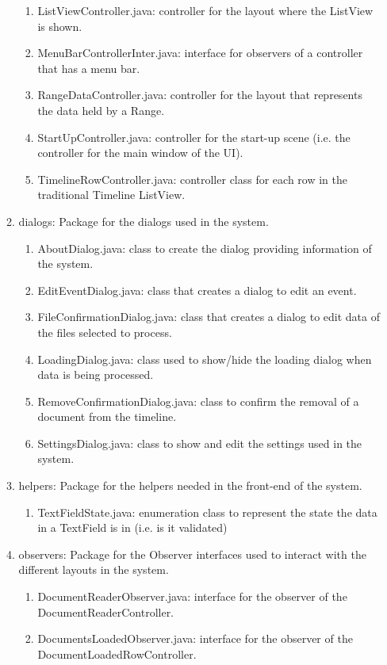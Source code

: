 \begin{enumerate}
\begin{enumerate}
\begin{enumerate}
			\item ListViewController.java: controller for the layout where the ListView is shown.
			\item MenuBarControllerInter.java: interface for observers of a controller that has a menu bar.
			\item RangeDataController.java: controller for the layout that represents the data held by a Range.
			\item StartUpController.java: controller for the start-up scene (i.e. the controller for the main window of the UI).
			\item TimelineRowController.java: controller class for each row in the traditional Timeline ListView.
		\end{enumerate}
		\item dialogs: Package for the dialogs used in the system.
		\begin{enumerate}
			\item AboutDialog.java: class to create the dialog providing information of the system.
			\item EditEventDialog.java: class that creates a dialog to edit an event.
			\item FileConfirmationDialog.java: class that creates a dialog to edit data of the files selected to process.
			\item LoadingDialog.java: class used to show/hide the loading dialog when data is being processed.
			\item RemoveConfirmationDialog.java: class to confirm the removal of a document from the timeline.
			\item SettingsDialog.java: class to show and edit the settings used in the system.
		\end{enumerate}
		\item helpers: Package for the helpers needed in the front-end of the system.
		\begin{enumerate}
			\item TextFieldState.java: enumeration class to represent the state the data in a TextField is in (i.e. is it validated)
		\end{enumerate}
		\item observers: Package for the Observer interfaces used to interact with the different layouts in the system.
		\begin{enumerate}
			\item DocumentReaderObserver.java: interface for the observer of the DocumentReaderController.
			\item DocumentsLoadedObserver.java: interface for the observer of the DocumentLoadedRowController.

\end{enumerate}
\end{enumerate}
\end{enumerate}
